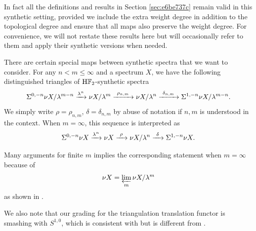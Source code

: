 \documentclass{amsart}
\numberwithin{equation}{section}
\newcommand{\HF}{\mathrm{H}\bF_2}
\begin{document}
In fact all the definitions and results in Section \ref{sec:e6be737c} remain valid in this synthetic setting, provided we include the extra weight degree in addition to the topological degree and ensure that all maps also preserve the weight degree. For convenience, we will not restate these results here but will occasionally refer to them and apply their synthetic versions when needed.

\begin{notation} \label{not:deltaandrho}
There are certain special maps between synthetic spectra that we want to consider. For any $n<m\le \infty$ and a spectrum $X$, we have the following  distinguished triangles of $\HF$-synthetic spectra
$$\Sigma^{0,-n}\nu X/\lambda^{m-n}\xrightarrow{\lambda^n} \nu X/\lambda^m\xrightarrow{~\rho_{n,m}~} \nu X/\lambda^n\xrightarrow{~\delta_{n,m}~} \Sigma^{1,-n}\nu X/\lambda^{m-n}.$$
We simply write $\rho=\rho_{n,m}$, $\delta=\delta_{n,m}$ by abuse of notation if $n,m$ is understood in the context.
When $m=\infty$, this sequence is interpreted  as
$$\Sigma^{0,-n}\nu X\xrightarrow{\lambda^n} \nu X\xrightarrow{~\rho~} \nu X/\lambda^n\xrightarrow{~\delta~} \Sigma^{1,-n}\nu X.$$

Many arguments for finite $m$ implies the corresponding statement when $m=\infty$ because of
$$\nu X=\varprojlim_{m} \nu X/\lambda^m$$
as shown in \cite[Proposition A.13]{BHS}.

We also note that our grading for the triangulation translation functor is smashing with $S^{1,0}$, which is consistent with \cite[Appendix A]{BHS} but is different from \cite[Section 7]{BurklundXu}.
\end{notation}

\end{document}

